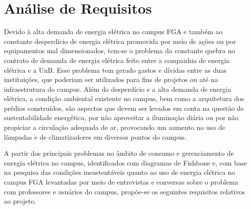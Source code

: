 \chapter[Análise de Requisitos]{Análise de Requisitos}

Devido à alta demanda de energia elétrica no campus FGA e também ao constante desperdício de energia elétrica promovida por meio de ações ou por equipamentos mal dimensionados, tem-se o problema da constante quebra no contrato de demanda de energia elétrica feito entre a companhia de energia elétrica e a UnB. Esse problema tem gerado gastos e dívidas entre as duas instituições, que poderiam ser utilizados para fins de projetos ou até na infraestrutura do campus. Além do desperdício e a alta demanda de energia elétrica, a condição ambiental existente no campus, bem como a arquitetura dos prédios construídos, são aspectos que devem ser levados em conta na questão de sustentabilidade energética, por não aproveitar a iluminação diária ou por não propiciar a circulação adequada de ar, provocando um aumento no uso de lâmpadas e de climatizadores em diversos pontos do campus.

A partir dos principais problemas no âmbito de consumo e gerenciamento de energia elétrica no campus, identificados com diagramas de Fishbone e, com base na pesquisa das condições insustentáveis quanto ao uso de energia elétrica no campus FGA levantadas por meio de entrevistas e conversas sobre o problema com professores e usuários do campus, propõe-se os seguintes requisitos relativos ao projeto.

